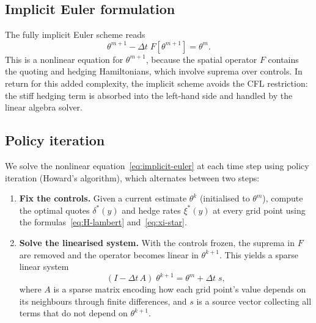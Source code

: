 \subsection{Implicit Euler formulation}
\label{sec:pde-implicit-euler}

The fully implicit Euler scheme reads
\begin{equation}
  \label{eq:implicit-euler}
  \theta^{m+1} - \Delta t\; F[\theta^{m+1}] = \theta^m.
\end{equation}
This is a nonlinear equation for $\theta^{m+1}$, because the spatial operator $F$ contains the quoting and hedging Hamiltonians, which involve suprema over controls. In return for this added complexity, the implicit scheme avoids the CFL restriction: the stiff hedging term is absorbed into the left-hand side and handled by the linear algebra solver.


\subsection{Policy iteration}
\label{sec:pde-pi}

We solve the nonlinear equation~\eqref{eq:implicit-euler} at each time step using policy iteration (Howard's algorithm), which alternates between two steps:

\begin{enumerate}
  \item \textbf{Fix the controls.} Given a current estimate $\theta^k$ (initialised to $\theta^m$), compute the optimal quotes $\delta^*(y)$ and hedge rates $\xi^*(y)$ at every grid point using the formulas~\eqref{eq:H-lambert} and~\eqref{eq:xi-star}.

  \item \textbf{Solve the linearised system.} With the controls frozen, the suprema in $F$ are removed and the operator becomes linear in $\theta^{k+1}$. This yields a sparse linear system
  \begin{equation}
    \label{eq:linearised-system}
    (I - \Delta t\,A)\;\theta^{k+1} = \theta^m + \Delta t\; s,
  \end{equation}
  where $A$ is a sparse matrix encoding how each grid point's value depends on its neighbours through finite differences, and $s$ is a source vector collecting all terms that do not depend on $\theta^{k+1}$.
\end{enumerate}

